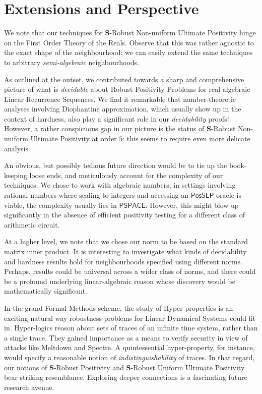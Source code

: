 \section{Extensions and Perspective}
\label{section:perspective}
We note that our techniques for $\mathbf{S}$-Robust Non-uniform Ultimate Positivity hinge on the First Order Theory of the Reals. Observe that this was rather agnostic to the exact shape of the neighbourhood: we can easily extend the same techniques to arbitrary \textit{semi-algebraic} neighbourhoods. 

As outlined at the outset, we contributed towards a sharp and comprehensive picture of what is \textit{decidable} about Robust Positivity Problems for real algebraic Linear Recurrence Sequences. We find it remarkable that number-theoretic analyses involving Diophantine approximation, which usually show up in the context of hardness, also play a significant role in our \textit{decidability} proofs! However, a rather conspicuous gap in our picture is the status of $\mathbf{S}$-Robust Non-uniform Ultimate Positivity at order $5$: this seems to require even more delicate analysis. 

An obvious, but possibly tedious future direction would be to tie up the book-keeping loose ends, and meticulously account for the complexity of our techniques. We chose to work with algebraic numbers; in settings involving rational numbers where scaling to integers and accessing an $\mathsf{PosSLP}$ oracle is viable, the complexity usually lies in $\mathsf{PSPACE}$. However, this might blow up significantly in the absence of efficient positivity testing for a different class of arithmetic circuit.

At a higher level, we note that we chose our norm to be based on the standard matrix inner product. It is interesting to investigate what kinds of decidability and hardness results hold for neighbourhoods specified using different norms. Perhaps, results could be universal across a wider class of norms, and there could be a profound underlying linear-algebraic reason whose discovery would be mathematically significant.

In the grand Formal Methods scheme, the study of Hyper-properties \cite{hyperproperties} is an exciting natural way robustness problems for Linear Dynamical Systems could fit in. Hyper-logics reason about sets of traces of an infinite time system, rather than a single trace. They gained importance as a means to verify security in view of attacks like Meltdown and Spectre. A quintessential hyper-property, for instance, would specify a reasonable notion of \textit{indistinguishability} of traces. In that regard, our notions of $\mathbf{S}$-Robust Positivity and $\mathbf{S}$-Robust Uniform Ultimate Positivity bear striking resemblance. Exploring deeper connections is a fascinating future research avenue.
